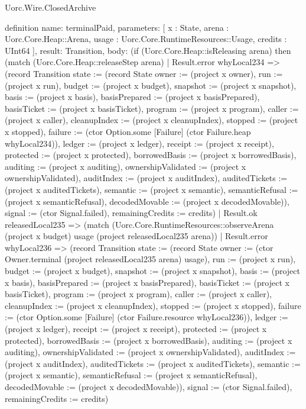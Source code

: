 \begin{lexlean}{Uorc.Wire.ClosedArchive}
\begin{semanticmodule}
definition{
  name: terminalPaid,
  parameters: [
    x : State,
    arena : Uorc.Core.Heap::Arena,
    usage : Uorc.Core.RuntimeResources::Usage,
    credits : UInt64
  ],
  result: Transition,
  body: (if (Uorc.Core.Heap::isReleasing arena) then (match (Uorc.Core.Heap::releaseStep arena)
    | Result.error whyLocal234 => (record Transition {state := (record State {owner := (project x owner), run := (project x run), budget := (project x budget), snapshot := (project x snapshot), basis := (project x basis), basisPrepared := (project x basisPrepared), basisTicket := (project x basisTicket), program := (project x program), caller := (project x caller), cleanupIndex := (project x cleanupIndex), stopped := (project x stopped), failure := (ctor Option.some [Failure] (ctor Failure.heap whyLocal234)), ledger := (project x ledger), receipt := (project x receipt), protected := (project x protected), borrowedBasis := (project x borrowedBasis), auditing := (project x auditing), ownershipValidated := (project x ownershipValidated), auditIndex := (project x auditIndex), auditedTickets := (project x auditedTickets), semantic := (project x semantic), semanticRefusal := (project x semanticRefusal), decodedMovable := (project x decodedMovable)}), signal := (ctor Signal.failed), remainingCredits := credits})
    | Result.ok releasedLocal235 => (match (Uorc.Core.RuntimeResources::observeArena (project x budget) usage (project releasedLocal235 arena))
      | Result.error whyLocal236 => (record Transition {state := (record State {owner := (ctor Owner.terminal (project releasedLocal235 arena) usage), run := (project x run), budget := (project x budget), snapshot := (project x snapshot), basis := (project x basis), basisPrepared := (project x basisPrepared), basisTicket := (project x basisTicket), program := (project x program), caller := (project x caller), cleanupIndex := (project x cleanupIndex), stopped := (project x stopped), failure := (ctor Option.some [Failure] (ctor Failure.resource whyLocal236)), ledger := (project x ledger), receipt := (project x receipt), protected := (project x protected), borrowedBasis := (project x borrowedBasis), auditing := (project x auditing), ownershipValidated := (project x ownershipValidated), auditIndex := (project x auditIndex), auditedTickets := (project x auditedTickets), semantic := (project x semantic), semanticRefusal := (project x semanticRefusal), decodedMovable := (project x decodedMovable)}), signal := (ctor Signal.failed), remainingCredits := credits})
}
\end{semanticmodule}
\end{lexlean}
